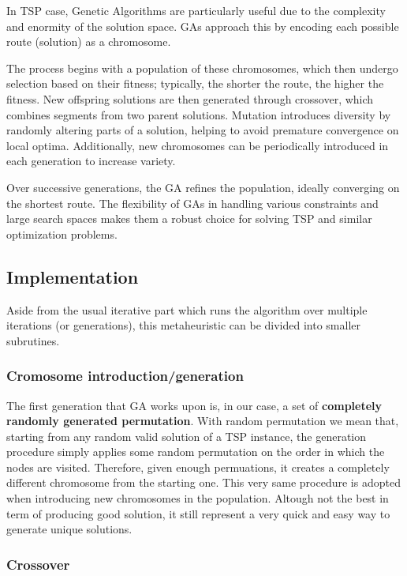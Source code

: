 In TSP case, Genetic Algorithms are particularly useful due to the complexity and enormity of the solution space.
GAs approach this by encoding each possible route (solution) as a chromosome.

The process begins with a population of these chromosomes, which then undergo selection based on their fitness; typically, the shorter the route, the higher the fitness.
New offspring solutions are then generated through crossover, which combines segments from two parent solutions.
Mutation introduces diversity by randomly altering parts of a solution, helping to avoid premature convergence on local optima.
Additionally, new chromosomes can be periodically introduced in each generation to increase variety.

Over successive generations, the GA refines the population, ideally converging on the shortest route.
The flexibility of GAs in handling various constraints and large search spaces makes them a robust choice for solving TSP and similar optimization problems.

\subsection{Implementation}

Aside from the usual iterative part which runs the algorithm over multiple iterations (or generations), this metaheuristic can be divided into smaller subrutines.

\subsubsection{Cromosome introduction/generation}

The first generation that GA works upon is, in our case, a set of \textbf{completely randomly generated permutation}.
With random permutation we mean that, starting from any random valid solution of a TSP instance, the generation procedure simply applies some random permutation on the order in which the nodes are visited.
Therefore, given enough permuations, it creates a completely different chromosome from the starting one.
This very same procedure is adopted when introducing new chromosomes in the population.
Altough not the best in term of producing good solution, it still represent a very quick and easy way to generate unique solutions.

\subsubsection{Crossover}


